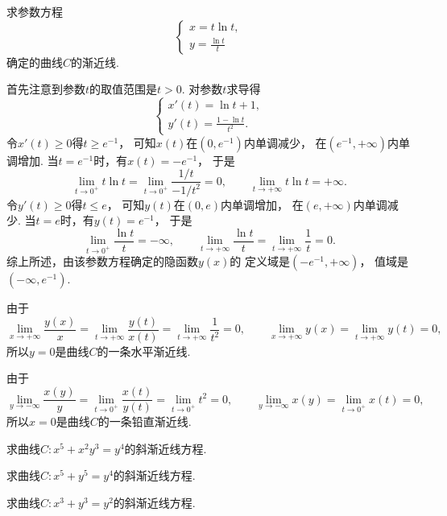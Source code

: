 \begin{example}
求参数方程\[
	\left\{ \begin{array}{l}
		x = t \ln t, \\
		y = \frac{\ln t}t
	\end{array} \right.
\]确定的曲线\(C\)的渐近线.
\begin{solution}
首先注意到参数\(t\)的取值范围是\(t>0\).
对参数\(t\)求导得\[
	\left\{ \begin{array}{l}
		x'(t) = \ln t + 1, \\
		y'(t) = \frac{1-\ln t}{t^2}.
	\end{array} \right.
\]
令\(x'(t) \geq 0\)得\(t \geq e^{-1}\)，
可知\(x(t)\)在\((0,e^{-1})\)内单调减少，
在\((e^{-1},+\infty)\)内单调增加.
当\(t = e^{-1}\)时，有\(x(t) = -e^{-1}\)，
于是\[
	\lim_{t\to0^+} t \ln t
	= \lim_{t\to0^+} \frac{1/t}{-1/t^2}
	= 0,
	\qquad
	\lim_{t\to+\infty} t \ln t
	= +\infty.
\]
令\(y'(t) \geq 0\)得\(t \leq e\)，
可知\(y(t)\)在\((0,e)\)内单调增加，
在\((e,+\infty)\)内单调减少.
当\(t = e\)时，有\(y(t) = e^{-1}\)，
于是\[
	\lim_{t\to0^+} \frac{\ln t}{t}
	= -\infty,
	\qquad
	\lim_{t\to+\infty} \frac{\ln t}{t}
	= \lim_{t\to+\infty} \frac1t
	= 0.
\]
综上所述，由该参数方程确定的隐函数\(y(x)\)的
定义域是\((-e^{-1},+\infty)\)，
值域是\((-\infty,e^{-1})\).

由于\[
	\lim_{x\to+\infty} \frac{y(x)}{x}
	= \lim_{t\to+\infty} \frac{y(t)}{x(t)}
	= \lim_{t\to+\infty} \frac1{t^2}
	= 0,
	\qquad
	\lim_{x\to+\infty} y(x)
	= \lim_{t\to+\infty} y(t)
	= 0,
\]
所以\(y=0\)是曲线\(C\)的一条水平渐近线.

由于\[
	\lim_{y\to-\infty} \frac{x(y)}{y}
	= \lim_{t\to0^+} \frac{x(t)}{y(t)}
	= \lim_{t\to0^+} t^2
	= 0,
	\qquad
	\lim_{y\to-\infty} x(y)
	= \lim_{t\to0^+} x(t)
	= 0,
\]
所以\(x=0\)是曲线\(C\)的一条铅直渐近线.
\end{solution}
\end{example}

\begin{example}
求曲线\(C: x^5+x^2y^3=y^4\)的斜渐近线方程.
\end{example}
\begin{example}
求曲线\(C: x^5+y^5=y^4\)的斜渐近线方程.
\end{example}

\begin{example}
求曲线\(C: x^3+y^3=y^2\)的斜渐近线方程.
\end{example}
